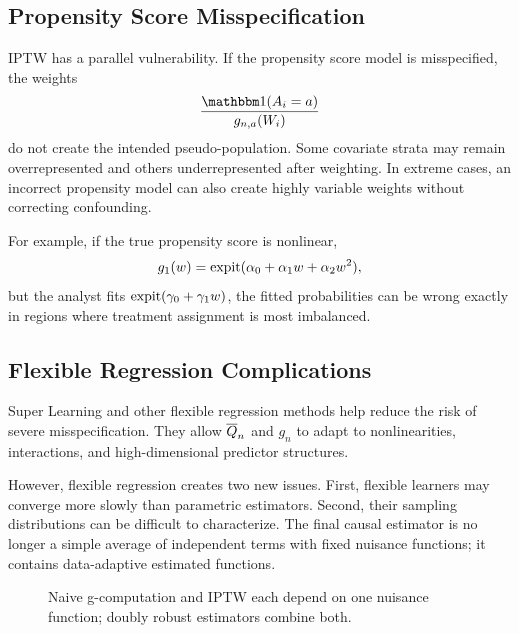 \subsection{Propensity Score Misspecification}

IPTW has a parallel vulnerability. If the propensity score model is misspecified, the
weights
\[
\frac{\ind(A_i=a)}{g_{n,a}(W_i)}
\]
do not create the intended pseudo-population. Some covariate strata may remain
overrepresented and others underrepresented after weighting. In extreme cases, an
incorrect propensity model can also create highly variable weights without correcting
confounding.

For example, if the true propensity score is nonlinear,
\[
g_1(w)=\operatorname{expit}(\alpha_0+\alpha_1w+\alpha_2w^2),
\]
but the analyst fits $\operatorname{expit}(\gamma_0+\gamma_1w)$, the fitted probabilities can be
wrong exactly in regions where treatment assignment is most imbalanced.

\subsection{Flexible Regression Complications}

Super Learning and other flexible regression methods help reduce the risk of severe
misspecification. They allow $\overline{Q}_n$ and $g_n$ to adapt to nonlinearities,
interactions, and high-dimensional predictor structures.

However, flexible regression creates two new issues. First, flexible learners may
converge more slowly than parametric estimators. Second, their sampling distributions
can be difficult to characterize. The final causal estimator is no longer a simple
average of independent terms with fixed nuisance functions; it contains data-adaptive
estimated functions.

\begin{figure}[H]
\centering
{}
\caption{Naive g-computation and IPTW each depend on one nuisance function; doubly robust estimators combine both.}
\label{fig:ch7-nuisance-dependence}
\end{figure}

